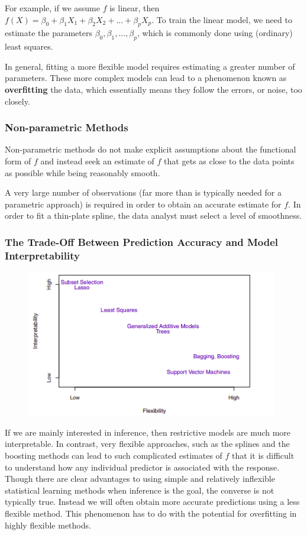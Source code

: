 \documentclass{article}
\numberwithin{equation}{section}
\begin{document}
For example, if we assume $f$ is linear, then $f(X) = \beta_0 + \beta_1X_1 + \beta_2X_2 + ... + \beta_p X_p$. To train the linear model, we need to estimate the parameters $\beta_0, \beta_1,..., \beta_p$, which is commonly done using (ordinary) least squares.


In general, fitting a more flexible model requires estimating a
greater number of parameters. These more complex models can lead to a phenomenon known as \textbf{overfitting} the data, which essentially means they follow the errors, or noise, too closely.

\subsubsection*{Non-parametric Methods}
Non-parametric methods do not make explicit assumptions about the functional form of $f$ and instead seek an estimate of $f$ that gets as close to the data points as possible while being reasonably smooth.

A very large number of observations (far more than is typically needed for a parametric approach) is required in order to obtain an accurate estimate for $f$. In order to fit a thin-plate spline, the data analyst must select a level of smoothness.

\subsubsection{The Trade-Off Between Prediction Accuracy and Model Interpretability}

\begin{figure}[H]
    \centering
    \includegraphics[width=11cm]{isl-figure-1.png}
\end{figure}


If we are mainly interested in inference, then restrictive models are much more interpretable.  In contrast, very flexible approaches, such as the splines and the boosting methods can lead to such complicated estimates of $f$ that it is difficult to understand how any individual predictor is associated with the response. 
Though there are clear advantages to using simple and relatively inflexible statistical learning methods when inference is the goal, the converse is not typically true. Instead we will often obtain more accurate predictions using a less flexible method. This phenomenon has to do with the potential for overfitting in highly flexible
methods.
\end{document}
